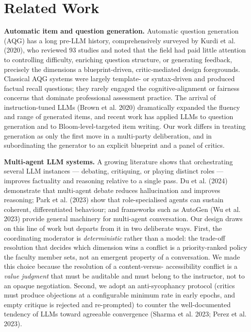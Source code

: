 \documentclass[
  11pt,
  letterpaper,
]{article}
\begin{document}
\section{Related Work}\label{related-work}

\textbf{Automatic item and question generation.} Automatic question
generation (AQG) has a long pre-LLM history, comprehensively surveyed by
Kurdi et al. (2020), who reviewed 93 studies and noted that the field
had paid little attention to controlling difficulty, enriching question
structure, or generating feedback, precisely the dimensions a
blueprint-driven, critic-mediated design foregrounds. Classical AQG
systems were largely template- or syntax-driven and produced factual
recall questions; they rarely engaged the cognitive-alignment or
fairness concerns that dominate professional assessment practice. The
arrival of instruction-tuned LLMs ({Brown et al.} 2020) dramatically
expanded the fluency and range of generated items, and recent work has
applied LLMs to question generation and to Bloom-level-targeted item
writing. Our work differs in treating generation as only the first move
in a multi-party deliberation, and in subordinating the generator to an
explicit blueprint and a panel of critics.

\textbf{Multi-agent LLM systems.} A growing literature shows that
orchestrating several LLM instances --- debating, critiquing, or playing
distinct roles --- improves factuality and reasoning relative to a
single pass. Du et al. (2024) demonstrate that multi-agent debate
reduces hallucination and improves reasoning; Park et al. (2023) show
that role-specialised agents can sustain coherent, differentiated
behaviour; and frameworks such as AutoGen (Wu et al. 2023) provide
general machinery for multi-agent conversation. Our design draws on this
line of work but departs from it in two deliberate ways. First, the
coordinating moderator is \emph{deterministic} rather than a model: the
trade-off resolution that decides which dimension wins a conflict is a
priority-ranked policy the faculty member sets, not an emergent property
of a conversation. We made this choice because the resolution of a
content-versus- accessibility conflict is a \emph{value judgment} that
must be auditable and must belong to the instructor, not to an opaque
negotiation. Second, we adopt an anti-sycophancy protocol (critics must
produce objections at a configurable minimum rate in early epochs, and
empty critique is rejected and re-prompted) to counter the
well-documented tendency of LLMs toward agreeable convergence ({Sharma
et al.} 2023; {Perez et al.} 2023).
\end{document}
